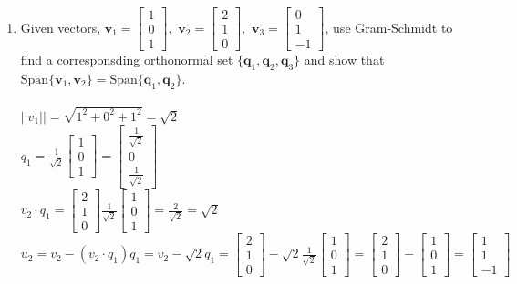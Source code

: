 \documentclass{article}
\begin{document}
{{\begin{enumerate}
\newpage\item Given vectors,
$\bm{v}_1=\left[
\begin{array}{ccc}
1 \\
0 \\
1
\end{array} \right], \,\,
\bm{v}_2=\left[
\begin{array}{ccc}
2\\
1 \\
0
\end{array} \right], \,\,
\bm{v}_3=\left[
\begin{array}{ccc}
0 \\
1 \\
-1
\end{array} \right]$, use Gram-Schmidt to find a corresponsding orthonormal set $\{\bm{q}_1,\bm{q}_2,\bm{q}_3\}$
and show that $\textrm{Span}\{\bm{v}_1,\bm{v}_2\}= \textrm{Span}\{\bm{q}_1,\bm{q}_2\}$.
\\
\\$||v_1||=\sqrt{1^2+0^2+1^2}=\sqrt{2}$
\\$q_1=\frac{1}{\sqrt{2}}\left[\begin{array}{ccc}1 \\0 \\1\end{array} \right]=\left[\begin{array}{ccc}\frac{1}{\sqrt{2}} \\0 \\\frac{1}{\sqrt{2}}\end{array} \right]$
\\$v_2\cdot q_1=\left[\begin{array}{ccc}2 \\1 \\0\end{array} \right]\frac{1}{\sqrt{2}}\left[\begin{array}{ccc}1 \\0 \\1\end{array} \right]=\frac{2}{\sqrt{2}}=\sqrt{2}$
\\$u_2=v_2-(v_2\cdot q_1)q_1=v_2-\sqrt{2}q_1=\left[\begin{array}{ccc}2 \\1 \\0\end{array} \right]-\sqrt{2}\frac{1}{\sqrt{2}}\left[\begin{array}{ccc}1 \\0 \\1\end{array} \right]=\left[\begin{array}{ccc}2 \\1 \\0\end{array} \right]-\left[\begin{array}{ccc}1 \\0 \\1\end{array} \right]=\left[\begin{array}{ccc}1 \\1 \\-1\end{array} \right]$

\end{enumerate}}}
\end{document}
